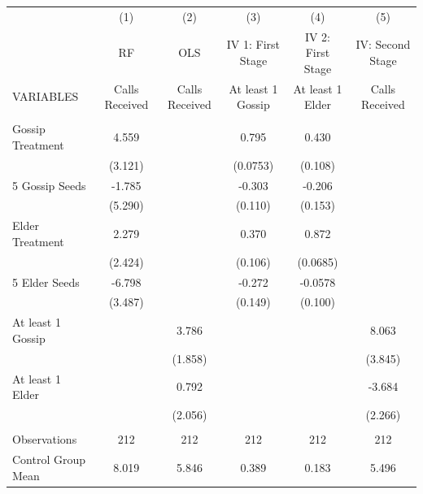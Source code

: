 \begin{tabular}{lccccc} \hline
 & (1) & (2) & (3) & (4) & (5) \\
 & RF & OLS & IV 1: First Stage & IV 2: First Stage & IV: Second Stage \\
VARIABLES & Calls Received & Calls Received & At least 1 Gossip & At least 1 Elder & Calls Received \\ \hline
 &  &  &  &  &  \\
Gossip Treatment & 4.559 &  & 0.795 & 0.430 &  \\
 & (3.121) &  & (0.0753) & (0.108) &  \\
5 Gossip Seeds & -1.785 &  & -0.303 & -0.206 &  \\
 & (5.290) &  & (0.110) & (0.153) &  \\
Elder Treatment & 2.279 &  & 0.370 & 0.872 &  \\
 & (2.424) &  & (0.106) & (0.0685) &  \\
5 Elder Seeds & -6.798 &  & -0.272 & -0.0578 &  \\
 & (3.487) &  & (0.149) & (0.100) &  \\
At least 1 Gossip &  & 3.786 &  &  & 8.063 \\
 &  & (1.858) &  &  & (3.845) \\
At least 1 Elder &  & 0.792 &  &  & -3.684 \\
 &  & (2.056) &  &  & (2.266) \\
 &  &  &  &  &  \\
Observations & 212 & 212 & 212 & 212 & 212 \\
 Control Group Mean & 8.019 & 5.846 & 0.389 & 0.183 & 5.496 \\ \hline
\end{tabular}
